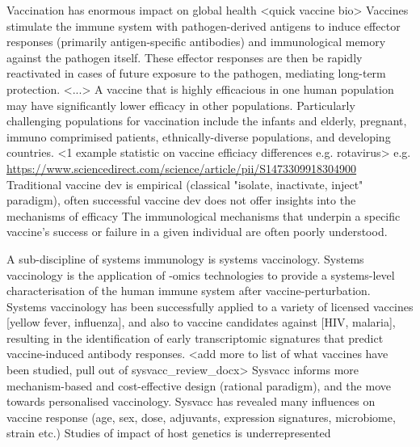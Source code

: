 \begin{outline}
\1 Vaccination has enormous impact on global health \autocite{greenwood2014ContributionVaccinationGlobal}
    \2 <quick vaccine bio>
        \3 Vaccines stimulate the immune system with pathogen-derived antigens to induce effector responses (primarily antigen-specific antibodies) and immunological memory against the pathogen itself.
        \3 These effector responses are then be rapidly reactivated in cases of future exposure to the pathogen, mediating long-term protection.
        \3 <...>
    \2 A vaccine that is highly efficacious in one human population may have significantly lower efficacy in other populations.
    Particularly challenging populations for vaccination include the infants and elderly, pregnant, immuno comprimised patients, ethnically-diverse populations, and developing countries.
        \3 <1 example statistic on vaccine efficiacy differences e.g. rotavirus>
        \3 e.g. \url{https://www.sciencedirect.com/science/article/pii/S1473309918304900}
    \2 Traditional vaccine dev is empirical (classical "isolate, inactivate, inject" paradigm), often successful vaccine dev does not offer insights into the mechanisms of efficacy 
    \2 The immunological mechanisms that underpin a specific vaccine's success or failure in a given individual are often poorly understood.

\1 A sub-discipline of systems immunology is systems vaccinology.
    \2 Systems vaccinology is the application of -omics technologies to provide a systems-level characterisation of the human immune system after vaccine-perturbation.
    \2 Systems vaccinology has been successfully applied to a variety of licensed vaccines [yellow fever, influenza], and also to vaccine candidates against [HIV, malaria], resulting in the identification of early transcriptomic signatures that predict vaccine-induced antibody responses.
        \3 <add more to list of what vaccines have been studied, pull out of sysvacc\_review\_docx>
    \2 Sysvacc informs more mechanism-based and cost-effective design (rational paradigm), and the move towards personalised vaccinology.
    \2 Sysvacc has revealed many influences on vaccine response (age, sex, dose, adjuvants, expression signatures, microbiome, strain etc.)
    \2 Studies of impact of host genetics is underrepresented \autocite{linnik2016ImpactHostGenetic}


\end{outline}
